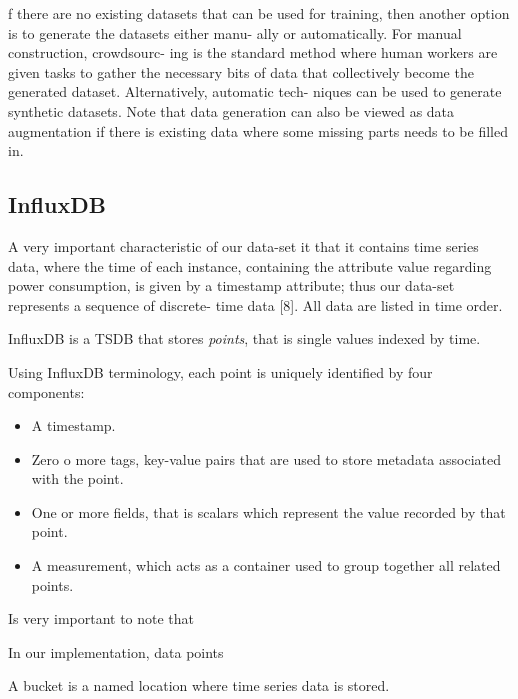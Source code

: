 \documentclass[12pt,a4paper]{report}
\begin{document}
f there are no existing datasets that can be used for training,
then another option is to generate the datasets either manu-
ally or automatically. For manual construction, crowdsourc-
ing is the standard method where human workers are given
tasks to gather the necessary bits of data that collectively
become the generated dataset. Alternatively, automatic tech-
niques can be used to generate synthetic datasets. Note that
data generation can also be viewed as data augmentation if
there is existing data where some missing parts needs to be
filled in.

\subsection{InfluxDB}

A very important characteristic of our data-set it that it contains time series data, where the time of each instance, containing the attribute value regarding power consumption, is given by a timestamp attribute; thus our data-set represents a sequence of discrete-
time data [8]. All data are listed in time order.


InfluxDB is a TSDB that stores \textit{points}, that is single values indexed by time. 

Using InfluxDB terminology, each point is uniquely identified by four components:

\begin{itemize}
	\item A timestamp.
	
	\item Zero o more tags, key-value pairs that are used to store metadata associated with the point. 
	 
	\item One or more fields, that is scalars which represent the value recorded by that point.
	
	\item A measurement, which acts as a container used to group together all related points.
	
\end{itemize}

Is very important to note that  

In our implementation, data points 

A bucket is a named location where time series data is stored.







\end{document}
